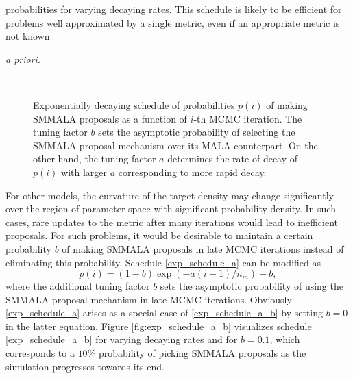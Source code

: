 \documentclass[twoside,11pt]{article}
\begin{document}
probabilities for varying decaying rates.  This schedule is likely to be efficient for problems well approximated by a single metric, even if an appropriate metric is not known {{\em a priori}.

\begin{figure}[t]
	\centering
	 \\
	\caption{Exponentially decaying schedule of probabilities $p(i)$ of making SMMALA proposals as a function of
	$i$-th MCMC iteration. The tuning factor $b$ sets the asymptotic probability of selecting the SMMALA proposal mechanism
	over its MALA counterpart. On the other hand, the tuning factor $a$ determines the rate of decay of $p(i)$ with larger 
	$a$ corresponding to more rapid decay.}
	\label{fig:exp_schedule}
\end{figure}

For other models, the curvature of the target density may change significantly over the region of parameter space with significant probability density.  In such cases, rare updates to the metric after many iterations would lead to inefficient proposals.  For such problems, it would be desirable to maintain a certain probability $b$ of making SMMALA 
proposals in late MCMC iterations instead of eliminating this probability. Schedule \eqref{exp_schedule_a} can be modified as
\begin{equation}
\label{exp_schedule_a_b}
p(i)=(1-b)\exp{(-a(i-1)/n_m)}+b,
\end{equation}
where the additional tuning factor $b$ sets the asymptotic probability of using the SMMALA proposal mechanism in late MCMC
iterations. Obviously \eqref{exp_schedule_a} arises as a special case of \eqref{exp_schedule_a_b} by setting $b=0$ in the 
latter equation. Figure \ref{fig:exp_schedule_a_b} visualizes schedule \eqref{exp_schedule_a_b} for varying decaying rates 
and for $b=0.1$, which corresponds to a $10\%$ probability of picking SMMALA proposals as the simulation progresses towards 
its end.

}
\end{document}
